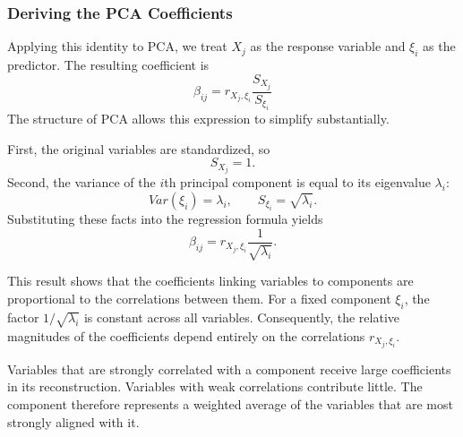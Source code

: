 \medskip

\subsubsection{Deriving the PCA Coefficients}

Applying this identity to PCA, we treat $X_j$ as the response variable and $\xi_i$ as the predictor. The resulting coefficient is
\[
\beta_{ij} = r_{X_j, \xi_i} \frac{S_{X_j}}{S_{\xi_i}}
\]
The structure of PCA allows this expression to simplify substantially.

First, the original variables are standardized, so
\[
S_{X_j} = 1.
\]
Second, the variance of the $i$th principal component is equal to its eigenvalue $\lambda_i$:
\[
Var(\xi_i) = \lambda_i,
\qquad
S_{\xi_i} = \sqrt{\lambda_i}.
\]
Substituting these facts into the regression formula yields
\[
\beta_{ij} = r_{X_j, \xi_i} \frac{1}{\sqrt{\lambda_i}}.
\]

This result shows that the coefficients linking variables to components are proportional to the correlations between them. For a fixed component $\xi_i$, the factor $1/\sqrt{\lambda_i}$ is constant across all variables. Consequently, the relative magnitudes of the coefficients depend entirely on the correlations $r_{X_j, \xi_i}$.

Variables that are strongly correlated with a component receive large coefficients in its reconstruction. Variables with weak correlations contribute little. The component therefore represents a weighted average of the variables that are most strongly aligned with it.

\medskip

